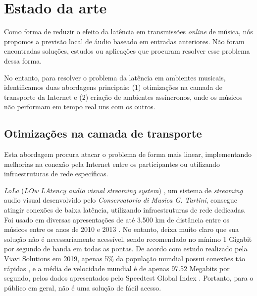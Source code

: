 \section{Estado da arte}


Como forma de reduzir o efeito da latência em transmissões \textit{online} de música, nós propomos a previsão local de áudio baseado em entradas anteriores. Não foram encontradas soluções, estudos ou aplicações que procuram resolver esse problema dessa forma.

No entanto, para resolver o problema da latência em ambientes musicais, identificamos duas abordagens principais: (1) otimizações na camada de transporte da Internet e (2) criação de ambientes assíncronos, onde os músicos não performam em tempo real uns com os outros.

\subsection{Otimizações na camada de transporte}
\label{subsec:delay-based-audio-solutions}

Esta abordagem procura atacar o problema de forma mais linear, implementando melhorias na conexão pela Internet entre os participantes ou utilizando infraestruturas de rede específicas.

\textit{LoLa} (\textit{LOw LAtency audio visual streaming system}) \cite{lola}, um sistema de \textit{streaming} audio visual desenvolvido pelo \textit{Conservatorio di Musica G. Tartini}, consegue atingir conexões de baixa latência, utilizando infraestruturas de rede dedicadas. Foi usado em diversas apresentações de até 3.500 km de distância entre os músicos entre os anos de 2010 e 2013 \cite{lola_streaming}. No entanto, deixa muito claro que sua solução não é necessariamente acessível, sendo recomendado no mínimo 1 Gigabit por segundo de banda em todas as pontas. De acordo com estudo realizado pela Viavi Solutions em 2019, apenas 5\% da população mundial possui conexões tão rápidas \cite{1gbps}, e a média de velocidade mundial é de apenas 97.52 Megabits por segundo, pelos dados apresentados pelo Speedtest Global Index \cite{speed_test}. Portanto, para o público em geral, não é uma solução de fácil acesso.

